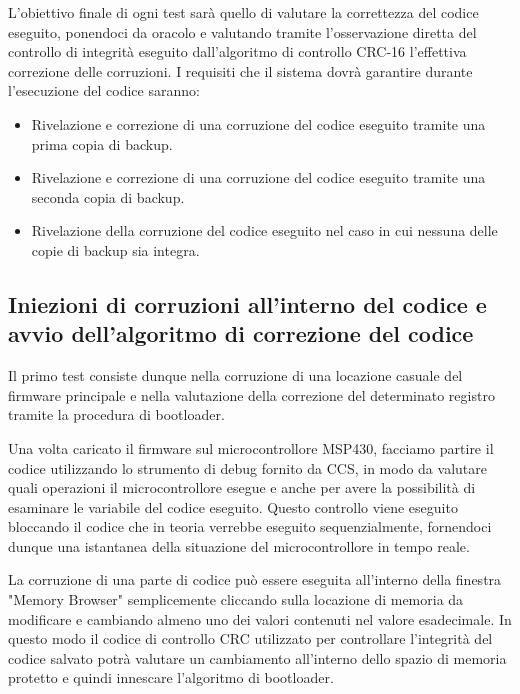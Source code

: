 \documentclass[LaM,binding=0.6cm,oneside]{../sapthesis}
\begin{document}
L'obiettivo finale di ogni test sarà quello di valutare la correttezza del codice eseguito, ponendoci da oracolo e valutando tramite l'osservazione diretta del controllo di integrità eseguito dall'algoritmo di controllo CRC-16 l'effettiva correzione delle corruzioni.\newline\newline
I requisiti che il sistema dovrà garantire durante l'esecuzione del codice saranno:
\begin{itemize}
    \item  Rivelazione e correzione di una corruzione del codice eseguito tramite una prima copia di backup.
    
    \item  Rivelazione e correzione di una corruzione del codice eseguito tramite una seconda copia di backup.
    
    \item  Rivelazione della corruzione del codice eseguito nel caso in cui nessuna delle copie di backup sia integra.
        
\end{itemize}


\subsection{Iniezioni di corruzioni all'interno del codice e avvio dell'algoritmo di correzione del codice}

Il primo test consiste dunque nella corruzione di una locazione casuale del firmware principale e nella valutazione della correzione del determinato registro tramite la procedura di bootloader.

Una volta caricato il firmware sul microcontrollore MSP430, facciamo partire il codice utilizzando lo strumento di debug fornito da CCS, in modo da valutare quali operazioni il microcontrollore esegue e anche per avere la possibilità di esaminare le variabile del codice eseguito. Questo controllo viene eseguito bloccando il codice che in teoria verrebbe eseguito sequenzialmente, fornendoci dunque una istantanea della situazione del microcontrollore in tempo reale.

La corruzione di una parte di codice può essere eseguita all'interno della finestra "Memory Browser" semplicemente cliccando sulla locazione di memoria da modificare e cambiando almeno uno dei valori contenuti nel valore esadecimale.
In questo modo il codice di controllo CRC utilizzato per controllare l'integrità del codice salvato potrà valutare un cambiamento all'interno dello spazio di memoria protetto e quindi innescare l'algoritmo di bootloader.
\end{document}
